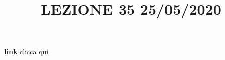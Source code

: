 \newline
\newline
\title{LEZIONE 35 25/05/2020}\newline
\textbf{link} \href{https://web.microsoftstream.com/video/f6f60f45-b416-4585-a538-d43c69ff1e22?list=user&userId=faa91214-a6f5-40d7-8875-253fd49b8ce1}{clicca qui}
